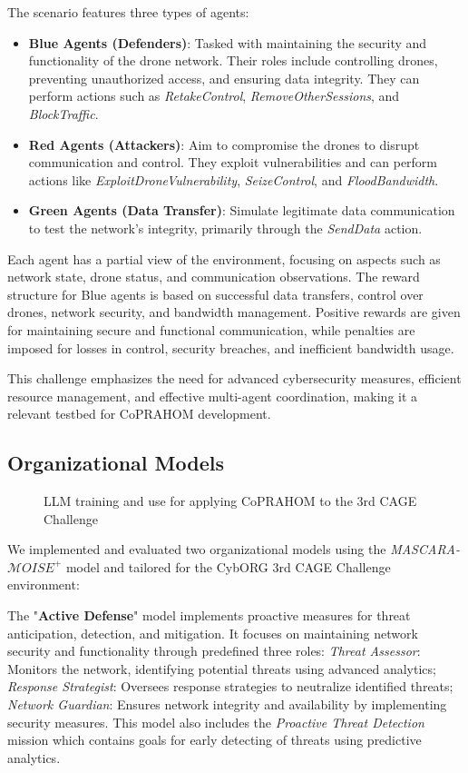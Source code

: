 The scenario features three types of agents:
\begin{itemize}
  \item \textbf{Blue Agents (Defenders)}: Tasked with maintaining the security and functionality of the drone network. Their roles include controlling drones, preventing unauthorized access, and ensuring data integrity. They can perform actions such as \textit{RetakeControl}, \textit{RemoveOtherSessions}, and \textit{BlockTraffic}.
  \item \textbf{Red Agents (Attackers)}: Aim to compromise the drones to disrupt communication and control. They exploit vulnerabilities and can perform actions like \textit{ExploitDroneVulnerability}, \textit{SeizeControl}, and \textit{FloodBandwidth}.
  \item \textbf{Green Agents (Data Transfer)}: Simulate legitimate data communication to test the network's integrity, primarily through the \textit{SendData} action.
\end{itemize}

Each agent has a partial view of the environment, focusing on aspects such as network state, drone status, and communication observations. The reward structure for Blue agents is based on successful data transfers, control over drones, network security, and bandwidth management. Positive rewards are given for maintaining secure and functional communication, while penalties are imposed for losses in control, security breaches, and inefficient bandwidth usage.

This challenge emphasizes the need for advanced cybersecurity measures, efficient resource management, and effective multi-agent coordination, making it a relevant testbed for CoPRAHOM development.

\subsection{Organizational Models}

\begin{figure}[h!]
  \centering
  
  \caption{LLM training and use for applying CoPRAHOM to the 3rd CAGE Challenge}\label{fig:llm_process}
\end{figure}


We implemented and evaluated two organizational models using the \textit{MASCARA-$\mathcal{M}OISE^+$} model and tailored for the CybORG 3rd CAGE Challenge environment:

The "\textbf{Active Defense}" model implements proactive measures for threat anticipation, detection, and mitigation. It focuses on maintaining network security and functionality through predefined three roles:
%
\textit{Threat Assessor}: Monitors the network, identifying potential threats using advanced analytics;
\textit{Response Strategist}: Oversees response strategies to neutralize identified threats;
\textit{Network Guardian}: Ensures network integrity and availability by implementing security measures.
%
This model also includes the \textit{Proactive Threat Detection} mission which contains goals for early detecting of threats using predictive analytics.

